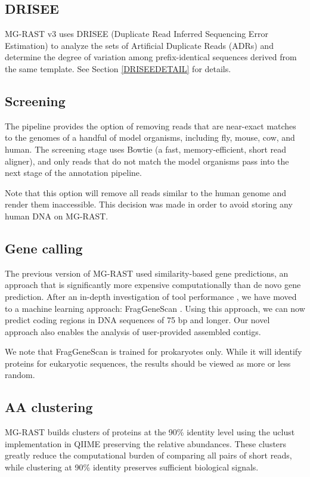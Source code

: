 \documentclass[12pt,fullpage]{report}
\begin{document}
\subsection{DRISEE}
\label{section:DRISEE}
MG-RAST v3 uses DRISEE (Duplicate Read Inferred Sequencing Error Estimation) \cite{DRISEE} to analyze the sets of Artificial Duplicate Reads (\gls{ADR}s) \cite{ADRS} and determine the degree of variation among prefix-identical sequences derived from the same template. See Section \ref{DRISEEDETAIL} for details.

\subsection{Screening}
The pipeline provides the option of removing reads that are near-exact matches to the genomes of a handful of model organisms, including fly, mouse, cow, and human. The screening stage uses Bowtie \cite{BOWTIE} (a fast, memory-efficient, short read aligner), and only reads that do not match the model organisms pass into the next stage of the annotation pipeline.

Note that this option will remove all reads similar to the human genome and render them inaccessible. This decision was made in order to avoid storing any human DNA on MG-RAST.
\subsection{Gene calling}

The previous version of MG-RAST used similarity-based gene predictions, an approach that is significantly more expensive computationally than de novo gene prediction. After an in-depth investigation of tool performance \cite{TRIMBLE_SHORT}, we have moved to a machine learning approach: FragGeneScan \cite{FGS}. Using this approach, we can now predict coding regions in DNA sequences of 75 bp and longer. Our novel approach also enables the analysis of user-provided assembled contigs.

We note that FragGeneScan is trained for prokaryotes only. While it will identify proteins for eukaryotic sequences, the results should be viewed as more or less random.
\subsection{AA clustering}
MG-RAST builds clusters of proteins at the 90\% identity level using the uclust \cite{UCLUST} implementation in QIIME \cite{QIIME} preserving the relative abundances. These clusters greatly reduce the computational burden of comparing all pairs of short reads, while clustering at 90\% identity preserves sufficient biological signals.
\end{document}
